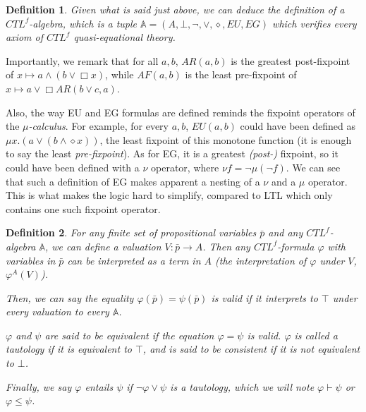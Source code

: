 \documentclass[11pt]{article}
\newtheorem{definition}{Definition}[section]
\begin{document}
\begin{definition}\label{CTLf-algebra}
    Given what is said just above, we can deduce the definition of a \emph{$CTL^f$-algebra}, which is a tuple $\mathbb{A}=(A,\bot,\neg,\vee,\diamond,EU,EG)$ which verifies every axiom of $CTL^f$ quasi-equational theory.
\end{definition}

Importantly, we remark that for all $a,b$, $AR(a,b)$ is the greatest post-fixpoint of $x \mapsto a \wedge (b \vee \Box x)$, while $AF(a,b)$ is the least pre-fixpoint of $x \mapsto a \vee \Box AR(b\vee c,a)$.

Also, the way EU and EG formulas are defined reminds the fixpoint operators of the \emph{$\mu$-calculus}. For example, for every $a,b$, $EU(a,b)$ could have been defined as $\mu x.(a \vee (b \wedge \diamond x))$, the least fixpoint of this monotone function (it is enough to say the least \emph{pre-fixpoint}). As for EG, it is a greatest \emph{(post-)} fixpoint, so it could have been defined with a $\nu$ operator, where $\nu f = \neg\mu(\neg f) $. We can see that such a definition of EG makes apparent a nesting of a $\nu$ and a $\mu$ operator. This is what makes the logic hard to simplify, compared to LTL which only contains one such fixpoint operator.  
\begin{definition}\label{interp_form_algebra}
    For any finite set of propositional variables $\bar{p}$ and any $CTL^f$-algebra $\mathbb{A}$, we can define a \emph{valuation} $V:\bar{p}\to A$. Then any $CTL^f$-formula $\varphi$ with variables in $\bar{p}$ can be interpreted as a term in $A$ (the \emph{interpretation} of $\varphi$ under $V$, $\varphi^A(V)$).

    Then, we can say the equality $\varphi(\bar{p})=\psi(\bar{p})$ is \emph{valid} if it interprets to $\top$ under every valuation to every $\mathbb{A}$.

    $\varphi$ and $\psi $ are said to be \emph{equivalent} if the equation $\varphi = \psi$ is valid. $\varphi$ is called a \emph{tautology} if it is equivalent to $\top$, and is said to be \emph{consistent} if it is not equivalent to $\bot$.

    Finally, we say $\varphi$ \emph{entails} $\psi$ if $\neg \varphi \vee \psi$ is a tautology, which we will note $\varphi \vdash \psi$ or $\varphi \leq \psi$.
\end{definition}
\end{document}
